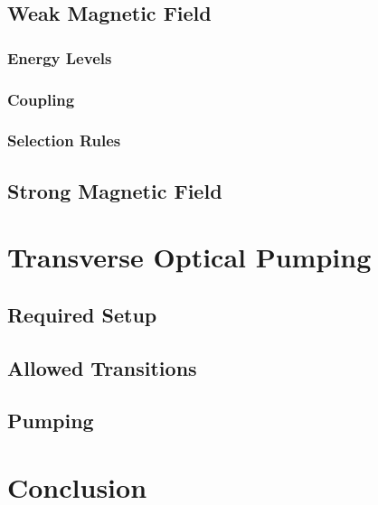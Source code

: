 \documentclass[letter,12pt]{article}
\begin{document}
	\subsection{Weak Magnetic Field}
		\subsubsection{Energy Levels}
		\subsubsection{Coupling}
		\subsubsection{Selection Rules}

	\subsection{Strong Magnetic Field}

\section{Transverse Optical Pumping}

	\subsection{Required Setup}

	\subsection{Allowed Transitions}

	\subsection{Pumping}

\section{Conclusion}



\end{document}
